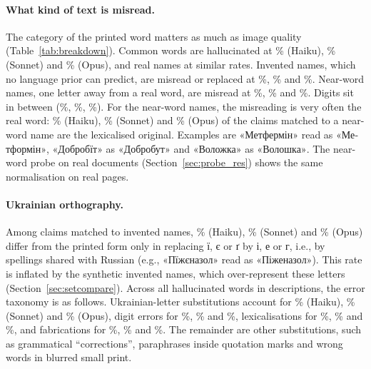 \paragraph{What kind of text is misread.} The category of the printed word matters as much as image quality (Table~\ref{tab:breakdown}). Common words are hallucinated at \CatWordHaiku\% (Haiku), \CatWordSonnet\% (Sonnet) and \CatWordOpus\% (Opus), and real names at similar rates. Invented names, which no language prior can predict, are misread or replaced at \CatNonceHaiku\%, \CatNonceSonnet\% and \CatNonceOpus\%. Near-word names, one letter away from a real word, are misread at \CatLureHaiku\%, \CatLureSonnet\% and \CatLureOpus\%. Digits sit in between (\CatNumHaiku\%, \CatNumSonnet\%, \CatNumOpus\%). For the near-word names, the misreading is very often the real word: \LureLexHaiku\% (Haiku), \LureLexSonnet\% (Sonnet) and \LureLexOpus\% (Opus) of the claims matched to a near-word name are the lexicalised original. Examples are \foreignlanguage{ukrainian}{«Метфермін»} read as \foreignlanguage{ukrainian}{«Метформін»}, \foreignlanguage{ukrainian}{«Добробїт»} as \foreignlanguage{ukrainian}{«Добробут»} and \foreignlanguage{ukrainian}{«Воложка»} as \foreignlanguage{ukrainian}{«Волошка»}. The near-word probe on real documents (Section~\ref{sec:probe_res}) shows the same normalisation on real pages.

\paragraph{Ukrainian orthography.} Among claims matched to invented names, \NonceUaHaiku\% (Haiku), \NonceUaSonnet\% (Sonnet) and \NonceUaOpus\% (Opus) differ from the printed form only in replacing \foreignlanguage{ukrainian}{ї, є} or \foreignlanguage{ukrainian}{ґ} by \foreignlanguage{ukrainian}{і, е} or \foreignlanguage{ukrainian}{г}, i.e., by spellings shared with Russian (e.g., \foreignlanguage{ukrainian}{«Пїжєназол»} read as \foreignlanguage{ukrainian}{«Піженазол»}). This rate is inflated by the synthetic invented names, which over-represent these letters (Section~\ref{sec:setcompare}). Across all hallucinated words in descriptions, the error taxonomy is as follows. Ukrainian-letter substitutions account for \SubUaHaiku\% (Haiku), \SubUaSonnet\% (Sonnet) and \SubUaOpus\% (Opus), digit errors for \SubDigitHaiku\%, \SubDigitSonnet\% and \SubDigitOpus\%, lexicalisations for \SubLexHaiku\%, \SubLexSonnet\% and \SubLexOpus\%, and fabrications for \SubFabHaiku\%, \SubFabSonnet\% and \SubFabOpus\%. The remainder are other substitutions, such as grammatical ``corrections'', paraphrases inside quotation marks and wrong words in blurred small print.

